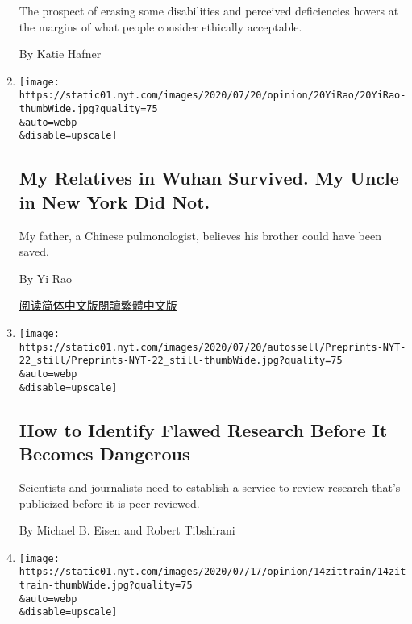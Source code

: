 \begin{enumerate}
  The prospect of erasing some disabilities and perceived deficiencies
  hovers at the margins of what people consider ethically acceptable.

  By Katie Hafner
\item
  \href{/2020/07/22/opinion/coronavirus-china-us.html}{}

  \texttt{[image: https://static01.nyt.com/images/2020/07/20/opinion/20YiRao/20YiRao-thumbWide.jpg?quality=75\\\&auto=webp\\\&disable=upscale]}

  \hypertarget{my-relatives-in-wuhan-survived-my-uncle-in-new-york-did-not}{%
  \subsection{My Relatives in Wuhan Survived. My Uncle in New York Did
  Not.}\label{my-relatives-in-wuhan-survived-my-uncle-in-new-york-did-not}}

  My father, a Chinese pulmonologist, believes his brother could have
  been saved.

  By Yi Rao

  \href{https://cn.nytimes.com/opinion/20200723/coronavirus-china-us/}{阅读简体中文版}\href{https://cn.nytimes.com/opinion/20200723/coronavirus-china-us/zh-hant/}{閱讀繁體中文版}
\item
  \href{/2020/07/20/opinion/coronavirus-preprints.html}{}

  \texttt{[image: https://static01.nyt.com/images/2020/07/20/autossell/Preprints-NYT-22\_still/Preprints-NYT-22\_still-thumbWide.jpg?quality=75\\\&auto=webp\\\&disable=upscale]}

  \hypertarget{how-to-identify-flawed-research-before-it-becomes-dangerous}{%
  \subsection{How to Identify Flawed Research Before It Becomes
  Dangerous}\label{how-to-identify-flawed-research-before-it-becomes-dangerous}}

  Scientists and journalists need to establish a service to review
  research that's publicized before it is peer reviewed.

  By Michael B. Eisen and Robert Tibshirani
\item
  \href{/2020/07/16/opinion/coronavirus-testing-us.html}{}

  \texttt{[image: https://static01.nyt.com/images/2020/07/17/opinion/14zittrain/14zittrain-thumbWide.jpg?quality=75\\\&auto=webp\\\&disable=upscale]}


\end{enumerate}
